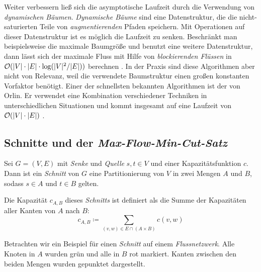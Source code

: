 Weiter verbessern ließ sich die asymptotische Laufzeit durch die Verwendung von \emph{dynamischen Bäumen}. \emph{Dynamische Bäume} sind eine Datenstruktur, die die nicht-saturierten Teile von \emph{augmentierenden} Pfaden speichern. Mit Operationen auf dieser Datenstruktur ist es möglich die Laufzeit zu senken. Beschränkt man beispielsweise die maximale Baumgröße und benutzt eine weitere Datenstruktur, dann lässt sich der maximale Fluss mit Hilfe von \emph{blockierenden Flüssen} in $\mathcal{O}(|V|\cdot |E|\cdot \log(|V|^2/|E|))$ berechnen \citep{gt14}. In der Praxis sind diese Algorithmen aber nicht von Relevanz, weil die verwendete Baumstruktur einen großen konstanten Vorfaktor benötigt. Einer der schnellsten bekannten Algorithmen ist der von Orlin. Er verwendet eine Kombination verschiedener Techniken in unterschiedlichen Situationen und kommt insgesamt auf eine Laufzeit von $\mathcal{O}(|V|\cdot |E|)$ \citep{gt14}.
 
\subsection{Schnitte und der \emph{Max-Flow-Min-Cut-Satz}}

\begin{definition}[Schnitt]
	Sei $G = (V,E)$ mit \emph{Senke} und \emph{Quelle} $s, t \in V$ und einer Kapazitätsfunktion $c$. Dann ist ein \emph{Schnitt} von $G$ eine Partitionierung von $V$ in zwei Mengen $A$ und $B$, sodass $s \in A$ und $t \in B$ gelten.
	
	Die Kapazität $c_{A,B}$ dieses \emph{Schnitts} ist definiert als die Summe der Kapazitäten aller Kanten von $A$ nach $B$:
	\begin{equation}
		c_{A,B} \coloneqq \sum_{(v,w) \in E \cap (A \times B)}{c(v,w)}
	\end{equation}
\end{definition}

Betrachten wir ein Beispiel für einen \emph{Schnitt} auf einem \emph{Flussnetzwerk}. Alle Knoten in $A$ wurden grün und alle in $B$ rot markiert. Kanten zwischen den beiden Mengen wurden gepunktet dargestellt.


